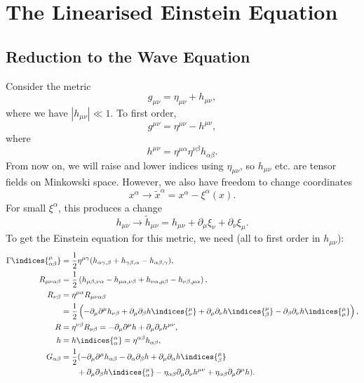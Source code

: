 \documentclass[12pt]{article}
\begin{document}
\newpage

\section{The Linearised Einstein Equation}
\label{sec:lee}

\subsection{Reduction to the Wave Equation}
\label{sub:red_we}

Consider the metric
\[
g_{\mu\nu} = \eta_{\mu\nu} + h_{\mu\nu},
\]
where we have $|h_{\mu\nu}| \ll 1$. To first order,
\[
g^{\mu\nu} = \eta^{\mu\nu} - h^{\mu\nu},
\]
where
\[
h^{\mu\nu} = \eta^{\mu\alpha} \eta^{\nu\beta} h_{\alpha\beta}.
\]
From now on, we will raise and lower indices using $\eta_{\mu\nu}$, so $h_{\mu\nu}$ etc. are tensor fields on Minkowski space. However, we also have freedom to change coordinates
\[
x^\alpha \to \tilde x^\alpha = x^\alpha - \xi^\alpha(x).
\]
For small $\xi^\alpha$, this produces a change
\[
h_{\mu\nu} \to \tilde h_{\mu\nu} = h_{\mu\nu} + \partial_\mu \xi_\nu + \partial_\nu \xi_\mu.
\]
To get the Einstein equation for this metric, we need (all to first order in $h_{\mu\nu}$):
\begin{align*}
	\Gamma\indices{^{\mu}_{\alpha\beta}} &= \frac{1}{2} \eta^{\mu\gamma} (h_{\alpha\gamma, \beta} + h_{\gamma\beta,\alpha} - h_{\alpha\beta,\gamma}), \\
	R_{\mu\nu\alpha\beta} &= \frac{1}{2} \left( h_{\mu\beta, \nu\alpha} - h_{\mu\alpha, \nu\beta} + h_{\nu\alpha,\mu\beta} - h_{\nu\beta,\mu\alpha}\right), \\
	R_{\nu\beta} &= \eta^{\mu\alpha} R_{\mu\nu\alpha\beta} \\
		     &= \frac{1}{2} \left( - \partial_\mu \partial^\mu h_{\nu\beta} + \partial_\mu \partial_\beta h\indices{_\nu^\mu} + \partial_\mu \partial_\nu h\indices{_{\beta}^\mu} - \partial_\beta \partial_\nu h\indices{_{\mu}^\mu} \right), \\
	R &= \eta^{\nu\beta} R_{\nu\beta} = - \partial_\mu \partial^\mu h + \partial_\mu \partial_\nu h^{\mu\nu}, \\
	h &= h\indices{_{\alpha}^\alpha} = \eta^{\alpha\beta} h_{\alpha\beta}, \\
	G_{\alpha\beta} &= \frac{1}{2}( - \partial_\mu \partial^\mu h_{\alpha\beta} - \partial_\alpha \partial_\beta h + \partial_\mu \partial_\alpha h\indices{_{\beta}^\mu} \\
			& \qquad + \partial_\mu \partial_\beta h\indices{_{\alpha}^\mu} - \eta_{\alpha\beta} \partial_\mu \partial_\nu h^{\mu\nu} + \eta_{\alpha\beta} \partial_\mu \partial^\mu h).
\end{align*}
\end{document}
